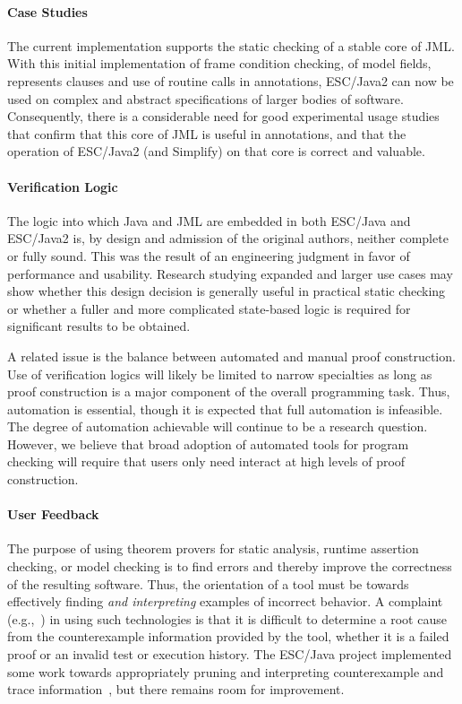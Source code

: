 \documentclass{llncs}
\begin{document}
\paragraph*{Case Studies} The current implementation supports the
static checking of a stable core of JML.  With this initial
implementation of frame condition checking, of model fields,
represents clauses and use of routine calls in annotations, ESC/Java2
can now be used on complex and abstract specifications of larger
bodies of software.  Consequently, there is a considerable need for
good experimental usage studies that confirm that this core of JML is
useful in annotations, and that the operation of ESC/Java2 (and
Simplify) on that core is correct and valuable.

\paragraph*{Verification Logic} The logic into which Java and JML are
embedded in both ESC/Java and ESC/Java2 is, by design and admission of
the original authors, neither complete or fully sound.  This was the
result of an engineering judgment in favor of performance and
usability.  Research studying expanded and larger use cases may show
whether this design decision is generally useful in practical static
checking or whether a fuller and more complicated state-based logic is
required for significant results to be obtained.

A related issue is the balance between automated and manual proof
construction.  Use of verification logics will likely be limited to
narrow specialties as long as proof construction is a major component
of the overall programming task.  Thus, automation is essential,
though it is expected that full automation is infeasible.  The degree
of automation achievable will continue to be a research question.
However, we believe that broad adoption of automated tools for program
checking will require that users only need interact at high levels of
proof construction.

\paragraph*{User Feedback} The purpose of using theorem provers for
static analysis, runtime assertion checking, or model checking is to
find errors and thereby improve the correctness of the resulting
software.  Thus, the orientation of a tool must be towards effectively
finding \emph{and interpreting} examples of incorrect behavior.  A
complaint (e.g.,~\cite{GroceVisser03}) in using such technologies is
that it is difficult to determine a root cause from the counterexample
information provided by the tool, whether it is a failed proof or an
invalid test or execution history.  The ESC/Java project implemented
some work towards appropriately pruning and interpreting
counterexample and trace information~\cite{PruningPaper}, but there
remains room for improvement.
\end{document}
